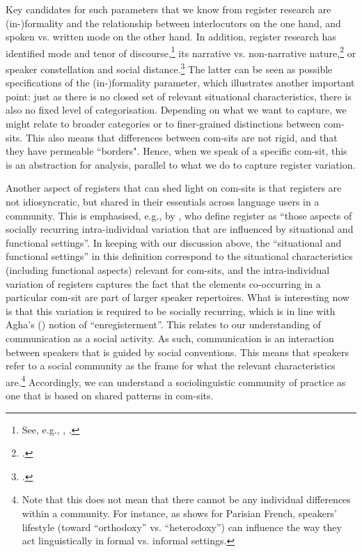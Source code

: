 Key candidates for such parameters that we know from register research are (in-)formality and the relationship between interlocutors on the one hand, and spoken vs. written mode on the other hand. In addition, register research has identified mode and tenor of discourse,\footnote{See, e.g., \citet{Neumann2014}, \citet{Halliday1978}.} its narrative vs. non-narrative nature,\footnote{\citet{Biber2014}.} or speaker constellation and social distance.\footnote{\citet{Maas2010}.} The latter can be seen as possible specifications of the (in\nobreakdash-)formality parameter, which illustrates another important point: just as there is no closed set of relevant situational characteristics, there is also no fixed level of categorisation. Depending on what we want to capture, we might relate to broader categories or to finer-grained distinctions between com-sits. This also means that differences between com-sits are not rigid, and that they have permeable “borders". Hence, when we speak of a specific com-sit, this is an abstraction for analysis, parallel to what we do to capture register variation.

Another aspect of registers that can shed light on com-sits is that registers are not idiosyncratic, but shared in their essentials across language users in a community. This is emphasised, e.g., by \citet[3]{LüdelingEtAl2019}, who define register as “those aspects of socially recurring intra-individual variation that are influenced by situational and functional settings”. In keeping with our discussion above, the “situational and functional settings” in this definition correspond to the situational characteristics (including functional aspects) relevant for com-sits, and the intra-individual variation of registers captures the fact that the elements co-occurring in a particular com-sit are part of larger speaker repertoires. What is interesting now is that this variation is required to be socially recurring, which is in line with Agha’s (\citeyear{Agha2004}) notion of “enregisterment”. This relates to our understanding of communication as a social activity. As such, communication is an interaction between speakers that is guided by social conventions. This means that speakers refer to a social community as the frame for what the relevant characteristics are.\footnote{Note that this does not mean that there cannot be any individual differences within a community. For instance, as \citet{Adli2017} shows for Parisian French, speakers’ lifestyle (toward “orthodoxy” vs. “heterodoxy”) can influence the way they act linguistically in formal vs. informal settings.} Accordingly, we can understand a sociolinguistic community of practice as one that is based on shared patterns in com-sits.

